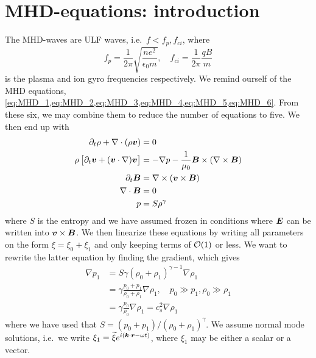 \section{MHD-equations: introduction}
The MHD-waves are ULF waves, i.e.~\(f<f_p,f_{ci}\), where
\begin{equation*}
    f_p=\frac{1}{2\pi}\sqrt{\frac{ne^2}{\epsilon_0m}},\quad f_{ci}=\frac{1}{2\pi}\frac{qB}{m}
\end{equation*}
is the plasma and ion gyro frequencies respectively. We remind ourself of the MHD equations, \cref{eq:MHD_1,eq:MHD_2,eq:MHD_3,eq:MHD_4,eq:MHD_5,eq:MHD_6}. From these six, we may combine them to reduce the number of equations to five. We then end up with
\begin{align}
    \partial_{t}\rho+\nabla\cdot\left(\rho \boldsymbol{v}\right)&=0\label{eq:simple_MHD1}\\
    \rho\left[\partial_{t}\boldsymbol{v}+(\boldsymbol{v}\cdot\nabla)\boldsymbol{v}\right]&=-\nabla p-\frac{1}{\mu_0}\boldsymbol{B}\times\left(\nabla\times\boldsymbol{B}\right)\label{eq:simple_MHD2}\\
    \partial_{t}\boldsymbol{B}&=\nabla\times\left(\boldsymbol{v}\times\boldsymbol{B}\right)\label{eq:simple_MHD3}\\
    \nabla\cdot\boldsymbol{B}&=0\label{eq:simple_MHD4}\\
    p&=S\rho^\gamma\label{eq:simple_MHD5}
\end{align}
where \(S\) is the entropy and we have assumed frozen in conditions where \(\boldsymbol{E}\) can be written into \(\boldsymbol{v}\times\boldsymbol{B}\). We then linearize these equations by writing all parameters on the form \(\xi=\xi_0+\xi_1\) and only keeping terms of \(\mathcal{O}(1)\) or less. We want to rewrite the latter equation by finding the gradient, which gives
\begin{equation}\label{eq:simplify_MHD6}
    \begin{aligned}
        \nabla p_1&=S\gamma{\left(\rho_0+\rho_1\right)}^{\gamma-1}\nabla\rho_1\\
        &=\gamma\frac{p_0+p_1}{\rho_0+\rho_1}\nabla\rho_1,\quad p_0\gg p_1, \rho_0\gg\rho_1\\
        &=\gamma\frac{p_0}{\rho_0}\nabla\rho_1=c_s^2\nabla\rho_1
    \end{aligned}
\end{equation}
where we have used that \(S=\left(p_0+p_1\right)/{\left(\rho_0+\rho_1\right)}^\gamma \). We assume normal mode solutions, i.e.\ we write \(\xi_1=\widetilde{\xi}e^{i\left(\boldsymbol{k}\cdot\boldsymbol{r}-\omega t\right)}\), where \(\xi_1\) may be either a scalar or a vector.

